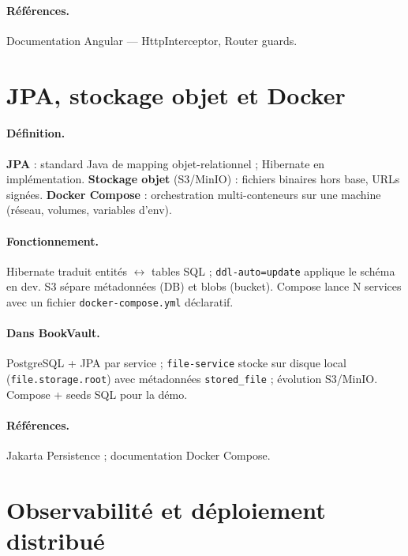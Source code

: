 \documentclass[12pt,a4paper]{report}
\begin{document}
\paragraph{Références.} Documentation Angular — HttpInterceptor, Router guards.\par


\section{JPA, stockage objet et Docker}

\paragraph{Définition.} \textbf{JPA} : standard Java de mapping objet-relationnel ; Hibernate en implémentation. \textbf{Stockage objet} (S3/MinIO) : fichiers binaires hors base, URLs signées. \textbf{Docker Compose} : orchestration multi-conteneurs sur une machine (réseau, volumes, variables d'env).\par

\paragraph{Fonctionnement.} Hibernate traduit entités $\leftrightarrow$ tables SQL ; \texttt{ddl-auto=update} applique le schéma en dev. S3 sépare métadonnées (DB) et blobs (bucket). Compose lance N services avec un fichier \texttt{docker-compose.yml} déclaratif.\par

\paragraph{Dans BookVault.} PostgreSQL + JPA par service ; \texttt{file-service} stocke sur disque local (\texttt{file.storage.root}) avec métadonnées \texttt{stored\_file} ; évolution S3/MinIO. Compose + seeds SQL pour la démo.\par

\paragraph{Références.} Jakarta Persistence ; documentation Docker Compose.\par


\section{Observabilité et déploiement distribué}
\end{document}
